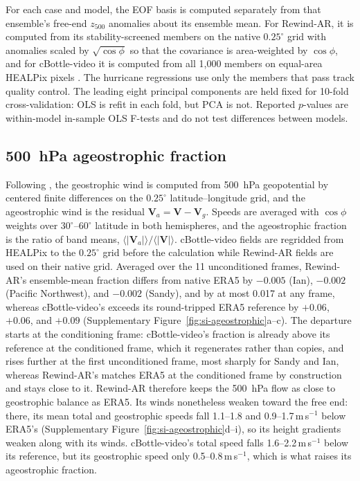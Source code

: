 \documentclass{article}
\begin{document}
For each case and model, the EOF basis is computed separately from that ensemble's free-end $z_{500}$ anomalies about its ensemble mean. For Rewind-AR, it is computed from its stability-screened members on the native $0.25^\circ$ grid with anomalies scaled by $\sqrt{\cos\phi}$ so that the covariance is area-weighted by $\cos\phi$, and for cBottle-video it is computed from all 1,000 members on equal-area HEALPix pixels \citep{Lin2026-sz}. The hurricane regressions use only the members that pass track quality control. The leading eight principal components are held fixed for 10-fold cross-validation: OLS is refit in each fold, but PCA is not. Reported $p$-values are within-model in-sample OLS F-tests and do not test differences between models.

\subsection{500~hPa ageostrophic fraction}

Following \citet{Lin2026-sz}, the geostrophic wind is computed from 500~hPa geopotential by centered finite differences on the $0.25^\circ$ latitude--longitude grid, and the ageostrophic wind is the residual $\mathbf{V}_a = \mathbf{V} - \mathbf{V}_g$. Speeds are averaged with $\cos\phi$ weights over $30^\circ$--$60^\circ$ latitude in both hemispheres, and the ageostrophic fraction is the ratio of band means, $\langle|\mathbf{V}_a|\rangle/\langle|\mathbf{V}|\rangle$. cBottle-video fields are regridded from HEALPix to the $0.25^\circ$ grid before the calculation while Rewind-AR fields are used on their native grid. Averaged over the 11 unconditioned frames, Rewind-AR's ensemble-mean fraction differs from native ERA5 by $-0.005$ (Ian), $-0.002$ (Pacific Northwest), and $-0.002$ (Sandy), and by at most 0.017 at any frame, whereas cBottle-video's exceeds its round-tripped ERA5 reference by $+0.06$, $+0.06$, and $+0.09$ (Supplementary Figure~\ref{fig:si-ageostrophic}a--c). The departure starts at the conditioning frame: cBottle-video's fraction is already above its reference at the conditioned frame, which it regenerates rather than copies, and rises further at the first unconditioned frame, most sharply for Sandy and Ian, whereas Rewind-AR's matches ERA5 at the conditioned frame by construction and stays close to it. Rewind-AR therefore keeps the 500~hPa flow as close to geostrophic balance as ERA5. Its winds nonetheless weaken toward the free end: there, its mean total and geostrophic speeds fall 1.1--1.8 and 0.9--1.7\,m\,s$^{-1}$ below ERA5's (Supplementary Figure~\ref{fig:si-ageostrophic}d--i), so its height gradients weaken along with its winds. cBottle-video's total speed falls 1.6--2.2\,m\,s$^{-1}$ below its reference, but its geostrophic speed only 0.5--0.8\,m\,s$^{-1}$, which is what raises its ageostrophic fraction.
\end{document}

